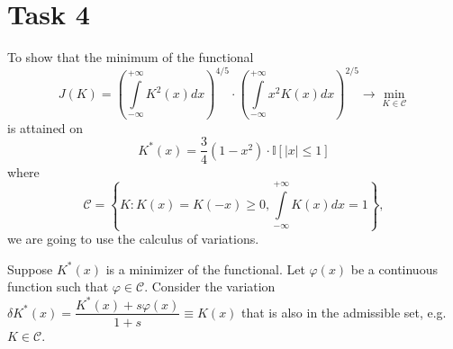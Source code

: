 \documentclass[a4paper, 12pt]{article}
\begin{document}
 
\section{Task 4}
To show that the minimum of the functional
$$
J(K) = \left( \int \limits_{- \infty}^{+\infty} K^2(x)dx \right)^{4/5} \cdot \left( \int \limits_{- \infty}^{+\infty} x^2 K(x)dx \right)^{2/5} \rightarrow \min \limits_{K \in \mathcal{C}}
$$
is attained on 
$$
K^*(x) = \dfrac{3}{4}(1 - x^2) \cdot \mathbb{I}[|x| \leqslant 1]
$$
where
\begin{equation}
\label{eq1}
\mathcal{C} = \left \{ K : K(x) = K(-x) \geqslant 0, \int \limits_{- \infty}^{+\infty} K(x)dx = 1 \right \},
\end{equation}
we are going to use the calculus of variations. 

Suppose $K^*(x)$ is a minimizer of the functional. Let $\varphi(x)$ be a continuous function such that $\varphi \in \mathcal{C}.$
Consider the variation $ \delta K^*(x) = \dfrac{K^*(x) + s \varphi(x)}{1 + s} \equiv K(x)$ that is also in the admissible set, e.g. $K \in \mathcal{C}.$
\end{document}
